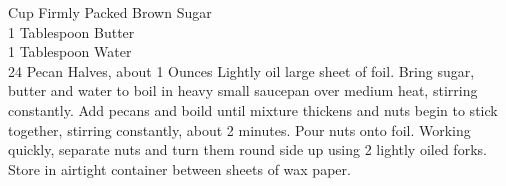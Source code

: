 { Cup Firmly Packed Brown Sugar \\
 1 Tablespoon Butter \\
 1 Tablespoon Water \\
 24 Pecan Halves, about 1 Ounces}
{Lightly oil large sheet of foil. Bring sugar, butter and water to boil in heavy small saucepan over medium heat, stirring constantly. Add pecans and boild until mixture thickens and nuts begin to stick together, stirring constantly, about 2 minutes. Pour nuts onto foil. Working quickly, separate nuts and turn them round side up using 2 lightly oiled forks. Store in airtight container between sheets of wax paper.}
